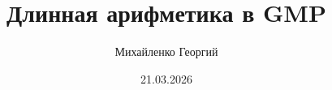 \documentclass[aspectratio=169]{beamer}
\title{Длинная арифметика в GMP}
\author{Михайленко Георгий}
\date{21.03.2026}
\begin{document}
\frame{\titlepage}

\end{document}
